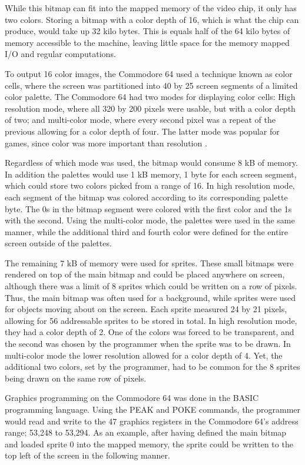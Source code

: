 While this bitmap can fit into the mapped memory of the video chip, it only has two colors.
Storing a bitmap with a color depth of 16, which is what the chip can produce, would take up 32 kilo bytes.
This is equals half of the 64 kilo bytes of memory accessible to the machine, leaving little space for the memory mapped I/O and regular computations.


To output 16 color images, the Commodore 64 used a technique known as color cells, where the screen was partitioned into 40 by 25 screen segments of a limited color palette. 
The Commodore 64 had two modes for displaying color cells: High resolution mode, where all 320 by 200 pixels were usable, but with a color depth of two; and multi-color mode, where every second pixel was a repeat of the previous allowing for a color depth of four.
The latter mode was popular for games, since color was more important than resolution \cite{bogdan2014games}.


Regardless of which mode was used, the bitmap would consume 8 kB of memory.
In addition the palettes would use 1 kB memory, 1 byte for each screen segment, which 
could store two colors picked from a range of 16.
In high resolution mode, each segment of the bitmap was colored according to its corresponding palette byte.
The 0s in the bitmap segment were colored with the first color and the 1s with the second.
Using the multi-color mode, the palettes were used in the same manner, while the additional third and fourth color were defined for the entire screen outside of the palettes.


The remaining 7 kB of memory were used for sprites.
These small bitmaps were rendered on top of the main bitmap and could be placed anywhere on screen, although there was a limit of 8 sprites which could be written on a row of pixels.
Thus, the main bitmap was often used for a background, while sprites were used for objects moving about on the screen.
Each sprite measured 24 by 21 pixels, allowing for 56 addressable sprites to be stored in total.
In high resolution mode, they had a color depth of 2.
One of the colors was forced to be transparent, and the second was chosen by the programmer when the sprite was to be drawn.
In multi-color mode the lower resolution allowed for a color depth of 4.
Yet, the additional two colors, set by the programmer, had to be common for the 8 sprites being drawn on the same row of pixels. 


Graphics programming on the Commodore 64 was done in the BASIC programming language.
Using the PEAK and POKE commands, the programmer would read and write to the 47 graphics registers in the Commodore 64’s address range; 53,248 to 53,294. 
As an example, after having defined the main bitmap and loaded sprite 0 into the mapped memory, the sprite could be written to the top left of the screen in the following manner. 



